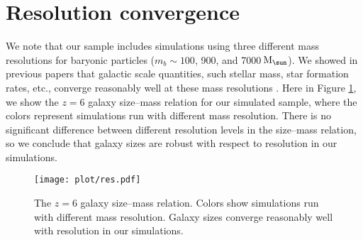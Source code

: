 \documentclass[useAMS,usenatbib]{mn2e}
\newcommand{\Msun}{{\rm M}_{\sun}}
\newcommand{\mb}{m_b}
\begin{document}
\section{Resolution convergence}
\label{sec:append:res}
We note that our sample includes simulations using three different mass resolutions for baryonic particles ($\mb\sim100$, 900, and 7000\,$\Msun$). We showed in previous papers that galactic scale quantities, such stellar mass, star formation rates, etc., converge reasonably well at these mass resolutions \citep[e.g.][]{hopkins.2017:fire2.numerics,ma.2017:fire.hiz.smf}. Here in Figure \ref{fig:res}, we show the $z=6$ galaxy size--mass relation for our simulated sample, where the colors represent simulations run with different mass resolution. There is no significant difference between different resolution levels in the size--mass relation, so we conclude that galaxy sizes are robust with respect to resolution in our simulations.

\begin{figure}
\centering
\texttt{[image: plot/res.pdf]}
\caption{The $z=6$ galaxy size--mass relation. Colors show simulations run with different mass resolution. Galaxy sizes converge reasonably well with resolution in our simulations.}
\label{fig:res}
\end{figure}

\label{lastpage}
\end{document}
